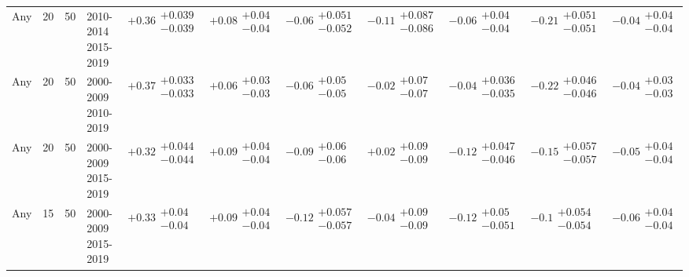 \begin{table}[H]
\begin{tabular}{lrrllllllll}
Any & 20 & 50 & \makecell{2010-2014 \\ 2015-2019} & $\bm{+0.36}\substack{+0.039 \\ -0.039}$ & $\bm{+0.08}\substack{+0.04 \\ -0.04}$ & $\bm{-0.06}\substack{+0.051 \\ -0.052}$ & $\bm{-0.11}\substack{+0.087 \\ -0.086}$ & $\bm{-0.06}\substack{+0.04 \\ -0.04}$ & $\bm{-0.21}\substack{+0.051 \\ -0.051}$ & $\bm{-0.04}\substack{+0.04 \\ -0.04}$ \\
Any & 20 & 50 & \makecell{2000-2009 \\ 2010-2019} & $\bm{+0.37}\substack{+0.033 \\ -0.033}$ & $\bm{+0.06}\substack{+0.03 \\ -0.03}$ & $\bm{-0.06}\substack{+0.05 \\ -0.05}$ & $-0.02\substack{+0.07 \\ -0.07}$ & $\bm{-0.04}\substack{+0.036 \\ -0.035}$ & $\bm{-0.22}\substack{+0.046 \\ -0.046}$ & $\bm{-0.04}\substack{+0.03 \\ -0.03}$ \\
Any & 20 & 50 & \makecell{2000-2009 \\ 2015-2019} & $\bm{+0.32}\substack{+0.044 \\ -0.044}$ & $\bm{+0.09}\substack{+0.04 \\ -0.04}$ & $\bm{-0.09}\substack{+0.06 \\ -0.06}$ & $+0.02\substack{+0.09 \\ -0.09}$ & $\bm{-0.12}\substack{+0.047 \\ -0.046}$ & $\bm{-0.15}\substack{+0.057 \\ -0.057}$ & $\bm{-0.05}\substack{+0.04 \\ -0.04}$ \\
Any & 15 & 50 & \makecell{2000-2009 \\ 2015-2019} & $\bm{+0.33}\substack{+0.04 \\ -0.04}$ & $\bm{+0.09}\substack{+0.04 \\ -0.04}$ & $\bm{-0.12}\substack{+0.057 \\ -0.057}$ & $-0.04\substack{+0.09 \\ -0.09}$ & $\bm{-0.12}\substack{+0.05 \\ -0.051}$ & $\bm{-0.1}\substack{+0.054 \\ -0.054}$ & $\bm{-0.06}\substack{+0.04 \\ -0.04}$ \\

\end{tabular}
\end{table}
